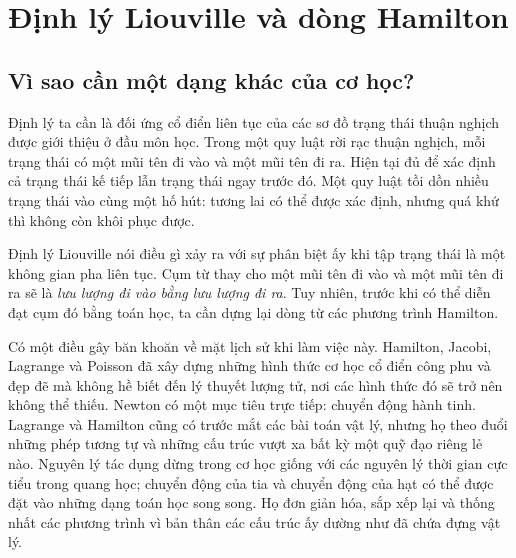 \chapter{Định lý Liouville và dòng Hamilton}


\section{Vì sao cần một dạng khác của cơ học?}

Định lý ta cần là đối ứng cổ điển liên tục của các sơ đồ trạng thái thuận nghịch được giới thiệu ở đầu môn học. Trong một quy luật rời rạc thuận nghịch, mỗi trạng thái có một mũi tên đi vào và một mũi tên đi ra. Hiện tại đủ để xác định cả trạng thái kế tiếp lẫn trạng thái ngay trước đó. Một quy luật tồi dồn nhiều trạng thái vào cùng một hố hút: tương lai có thể được xác định, nhưng quá khứ thì không còn khôi phục được.

Định lý Liouville nói điều gì xảy ra với sự phân biệt ấy khi tập trạng thái là một không gian pha liên tục. Cụm từ thay cho một mũi tên đi vào và một mũi tên đi ra sẽ là \emph{lưu lượng đi vào bằng lưu lượng đi ra}. Tuy nhiên, trước khi có thể diễn đạt cụm đó bằng toán học, ta cần dựng lại dòng từ các phương trình Hamilton.

Có một điều gây băn khoăn về mặt lịch sử khi làm việc này. Hamilton, Jacobi, Lagrange và Poisson đã xây dựng những hình thức cơ học cổ điển công phu và đẹp đẽ mà không hề biết đến lý thuyết lượng tử, nơi các hình thức đó sẽ trở nên không thể thiếu. Newton có một mục tiêu trực tiếp: chuyển động hành tinh. Lagrange và Hamilton cũng có trước mắt các bài toán vật lý, nhưng họ theo đuổi những phép tương tự và những cấu trúc vượt xa bất kỳ một quỹ đạo riêng lẻ nào. Nguyên lý tác dụng dừng trong cơ học giống với các nguyên lý thời gian cực tiểu trong quang học; chuyển động của tia và chuyển động của hạt có thể được đặt vào những dạng toán học song song. Họ đơn giản hóa, sắp xếp lại và thống nhất các phương trình vì bản thân các cấu trúc ấy dường như đã chứa đựng vật lý.

